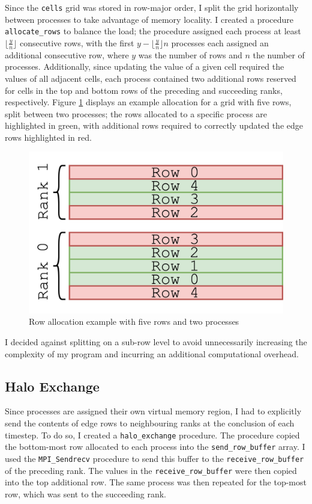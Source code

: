 \documentclass[twocolumn, a4paper]{article}
\begin{document}
Since the \texttt{cells} grid was stored in row-major order, I split the grid horizontally between processes to take advantage of memory locality.
I created a procedure \texttt{allocate\_rows} to balance the load; the procedure assigned each process at least $\lfloor\frac{y}{n}\rfloor$ consecutive rows, with the first $y - \lfloor\frac{y}{n}\rfloor n$ processes each assigned an additional consecutive row, where $y$ was the number of rows and $n$ the number of processes.
Additionally, since updating the value of a given cell required the values of all adjacent cells, each process contained two additional rows reserved for cells in the top and bottom rows of the preceding and succeeding ranks, respectively.
Figure \ref{fig:rows} displays an example allocation for a grid with five rows, split between two processes; the rows allocated to a specific process are highlighted in green, with additional rows required to correctly updated the edge rows highlighted in red.

\begin{figure}[htbp]
  \centering
  \includegraphics[width=.75\linewidth]{rows.png}
  \caption{Row allocation example with five rows and two processes}\label{fig:rows}
\end{figure}

I decided against splitting on a sub-row level to avoid unnecessarily increasing the complexity of my program and incurring an additional computational overhead.

\subsection{Halo Exchange}

Since processes are assigned their own virtual memory region, I had to explicitly send the contents of edge rows to neighbouring ranks at the conclusion of each timestep.
To do so, I created a \texttt{halo\_exchange} procedure.
The procedure copied the bottom-most row allocated to each process into the \texttt{send\_row\_buffer} array.
I used the \texttt{MPI\_Sendrecv} procedure to send this buffer to the \texttt{receive\_row\_buffer} of the preceding rank.
The values in the \texttt{receive\_row\_buffer} were then copied into the top additional row.
The same process was then repeated for the top-most row, which was sent to the succeeding rank.
\end{document}
